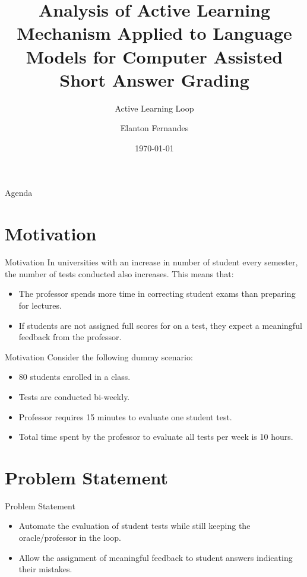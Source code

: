 \documentclass[aspectratio=169]{beamer}
\author[Elanton Fernandes]{Elanton Fernandes}
\subtitle{ Active Learning Loop}
\title{Analysis of Active Learning Mechanism Applied to Language Models for Computer Assisted Short Answer Grading}
\institute[HBRS]{Hochschule Bonn-Rhein-Sieg}
\date{\today}
\begin{document}
{
\begin{frame}
\titlepage
\end{frame}
\begin{frame}{Agenda}
\tableofcontents
\end{frame}
}


\section{Motivation}
\begin{frame}{Motivation}
	In universities with an increase in number of student every semester, the number of tests conducted also increases. This means that:
	\begin{itemize}
		\item The professor spends more time in correcting student exams than preparing for lectures.
		\item If students are not assigned full scores for on a test, they expect a meaningful feedback from the professor.
	\end{itemize}
\end{frame}
\begin{frame}{Motivation}
	Consider the following dummy scenario:
	\begin{itemize}
		\item 80 students enrolled in a class.
		\item Tests are conducted bi-weekly.
		\item Professor requires 15 minutes to evaluate one student test.
		\item Total time spent by the professor to evaluate all tests per week is 10 hours. 
	\end{itemize}
\end{frame}
\section{Problem Statement}
\begin{frame}{Problem Statement}
	\begin{itemize}
		\item Automate the evaluation of student tests while still keeping the oracle/professor in the loop.
		\item Allow the assignment of meaningful feedback to student answers indicating their mistakes.
	\end{itemize}
	
\end{frame}
\end{document}
